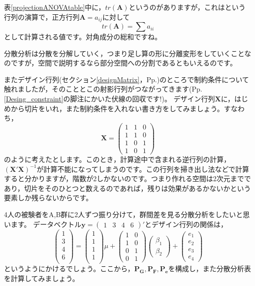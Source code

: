 \documentclass{ltjsbook}
\begin{document}
表\ref{projectionANOVAtable}中に，$tr(\bm{A})$というのがありますが，これはという行列の演算で，正方行列$\bm{A} ={a_{ij}}$に対して
\[ tr(\bm{A}) = \sum a_{ii} \]
として計算される値です。対角成分の総和ですね。

分散分析は分散を分解していく，つまり足し算の形に分離変形をしていくことなのですが，空間で説明するなら部分空間への分割であるともいえるのです。

またデザイン行列(セクション\ref{designMatrix}，Pp.\pageref{designMatrix})のところで制約条件について触れましたが，そのこととこの射影行列がつながってきます(Pp.\ref{Desing_constraint}の脚注にかいた伏線の回収です!)。
デザイン行列$\bm{X}$に，はじめから切片をいれ，また制約条件を入れない書き方をしてみましょう。すなわち，
\[
	\bm{X} = \begin{pmatrix}1 & 1 & 0 \\1 & 1 & 0 \\1 & 0 & 1 \\1 & 0 & 1 \end{pmatrix}
\]
のように考えたとします。このとき，計算途中で含まれる逆行列の計算，$(\bm{X}'\bm{X})^{-1}$が計算不能になってしまうのです。この行列を掃き出し法などで計算すると分かりますが，階数が2しかないのです。つまり作れる空間は2次元までであり，切片をそのひとつと数えるのであれば，残りは効果があるかないかという要素しか残らないからです。


\begin{reidai}{}{}
	4人の被験者をA,B群に2人ずつ振り分けて，群間差を見る分散分析をしたいと思います。
	データベクトル$\bm{y} = \begin{pmatrix}1&3&4&6\end{pmatrix}'$とデザイン行列の関係は，
	\[ \begin{pmatrix}1\\3\\4\\6\\\end{pmatrix} = \begin{pmatrix}1\\1\\1\\1\\\end{pmatrix}\mu +
		\begin{pmatrix} 1 & 0\\1 & 0 \\ 0 & 1 \\ 0 & 1\end{pmatrix}
		\begin{pmatrix}\beta_1\\\beta_2\end{pmatrix} +
		\begin{pmatrix}e_1\\e_2\\e_3\\e_4\end{pmatrix} \]
	というようにかけるでしょう。ここから，$\bm{P_G},\bm{P_F},\bm{P_e}$を構成し，また分散分析表を計算してみましょう。
\end{reidai}
\end{document}
